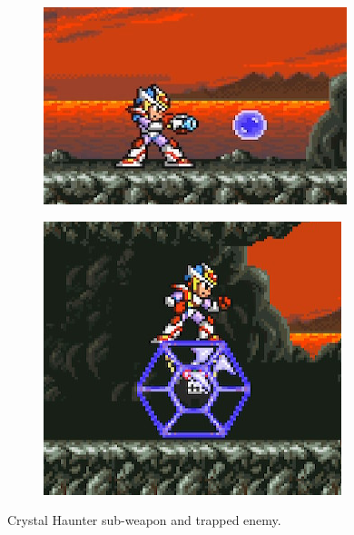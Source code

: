 \begin{figure}[htp]
	\centering
	\begin{subfigure}{0.39\linewidth}
		\includegraphics[width=\linewidth]{figures/X2/weapons/C_haunter_1.png}	
	\end{subfigure}
	\begin{subfigure}{0.275\linewidth}
		\includegraphics[width=\linewidth]{figures/X2/weapons/C_haunter_2.png}	
	\end{subfigure}
	\caption{Crystal Haunter sub-weapon and trapped enemy.}
\end{figure}

